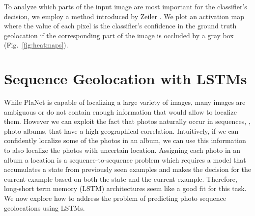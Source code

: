 \documentclass[10pt,twocolumn,letterpaper]{article}
\begin{document}
\begin{figure*}[t]
  \centering
   \vspace{1pt}
 \vspace{1pt}
 \vspace{1pt}

  \caption{Left: Input image, right: Heatmap of the probability of the correct class when sliding an occluding window over the image as in \cite{Zeiler14ECCV}. (a) Grand Canyon. Occluding the distinctive mountain formation makes the confidence in the correct location drop the most. (b) Norway. While the house in the foreground is fairly generic, the snowy mountain range on the left is the most important cue. (c) Shanghai. Confidence in the correct location increases if the palm trees in the foreground are covered since they are not common in Shanghai.}
  \label{fig:heatmaps}
\end{figure*}
To analyze which parts of the input image are most important for the classifier's decision, we employ a method introduced by Zeiler \etal \cite{Zeiler14ECCV}. We plot an activation map where the value of each pixel is the classifier's confidence in the ground truth geolocation if the corresponding part of the image is occluded by a gray box (Fig.~\ref{fig:heatmaps}).


\section{Sequence Geolocation with LSTMs}
\label{sec:lstm}
While PlaNet is capable of localizing a large variety of images,
many images are ambiguous or do not contain enough information that
would allow to localize them. However we can exploit the fact that
photos naturally occur in sequences, \eg, photo albums, that have a high
geographical correlation. Intuitively, if we can confidently localize
some of the photos in an album, we can use this information to also
localize the photos with uncertain location. Assigning each photo in
an album a location is a sequence-to-sequence problem which requires a
model that accumulates a state from previously seen examples and makes
the decision for the current example based on both the state and the
current example. Therefore, long-short term memory (LSTM)
architectures \cite{Hochreiter97NC} seem like a good fit for this
task. We now explore how to address the problem of predicting photo
sequence geolocations using LSTMs.
\end{document}
